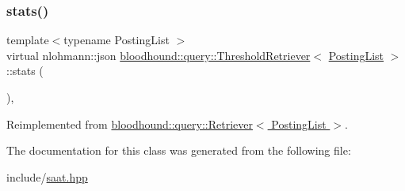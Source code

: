 \mbox{\label{classbloodhound_1_1query_1_1ThresholdRetriever_aa21e5b44d70bfdf058e5f9c5a1abc008}} 
\subsubsection{\texorpdfstring{stats()}{stats()}}
{\footnotesize\ttfamily template$<$typename Posting\+List $>$ \\
virtual nlohmann\+::json \hyperlink{classbloodhound_1_1query_1_1ThresholdRetriever}{bloodhound\+::query\+::\+Threshold\+Retriever}$<$ \hyperlink{classbloodhound_1_1PostingList}{Posting\+List} $>$\+::stats (\begin{DoxyParamCaption}{ }\end{DoxyParamCaption})\hspace{0.3cm}{\ttfamily [inline]}, {\ttfamily [virtual]}}



Reimplemented from \hyperlink{classbloodhound_1_1query_1_1Retriever_a58da32a5139b980ba874f8b5e6bb89ec}{bloodhound\+::query\+::\+Retriever$<$ Posting\+List $>$}.



The documentation for this class was generated from the following file\+:\begin{DoxyCompactItemize}
\item 
include/\hyperlink{saat_8hpp}{saat.\+hpp}\end{DoxyCompactItemize}
